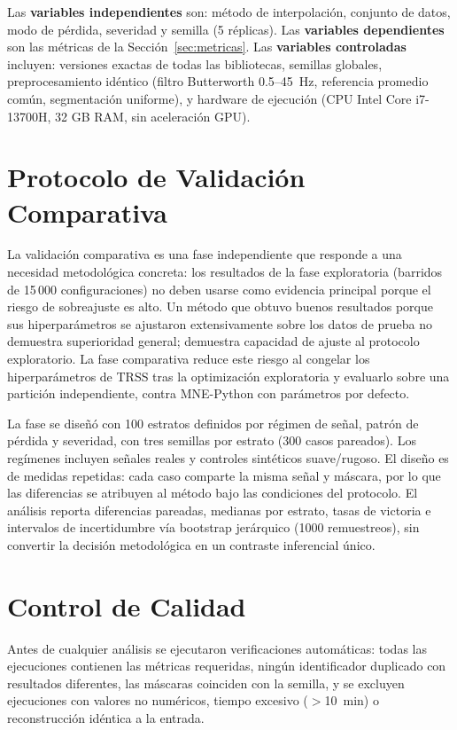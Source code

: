 Las \textbf{variables independientes} son: método de interpolación, conjunto de datos, modo de pérdida, severidad y semilla (5 réplicas). Las \textbf{variables dependientes} son las métricas de la Sección~\ref{sec:metricas}. Las \textbf{variables controladas} incluyen: versiones exactas de todas las bibliotecas, semillas globales, preprocesamiento idéntico (filtro Butterworth 0.5--45~Hz, referencia promedio común, segmentación uniforme), y hardware de ejecución (CPU Intel Core i7-13700H, 32 GB RAM, sin aceleración GPU).

\section{Protocolo de Validación Comparativa}
\label{sec:confirmatory}

La validación comparativa es una fase independiente que responde a una necesidad metodológica concreta: los resultados de la fase exploratoria (barridos de 15\,000 configuraciones) no deben usarse como evidencia principal porque el riesgo de sobreajuste es alto. Un método que obtuvo buenos resultados porque sus hiperparámetros se ajustaron extensivamente sobre los datos de prueba no demuestra superioridad general; demuestra capacidad de ajuste al protocolo exploratorio. La fase comparativa reduce este riesgo al congelar los hiperparámetros de TRSS tras la optimización exploratoria y evaluarlo sobre una partición independiente, contra MNE-Python con parámetros por defecto.

La fase se diseñó con 100 estratos definidos por régimen de señal, patrón de pérdida y severidad, con tres semillas por estrato (300 casos pareados). Los regímenes incluyen señales reales y controles sintéticos suave/rugoso. El diseño es de medidas repetidas: cada caso comparte la misma señal y máscara, por lo que las diferencias se atribuyen al método bajo las condiciones del protocolo. El análisis reporta diferencias pareadas, medianas por estrato, tasas de victoria e intervalos de incertidumbre vía bootstrap jerárquico (1000 remuestreos), sin convertir la decisión metodológica en un contraste inferencial único.

\section{Control de Calidad}

Antes de cualquier análisis se ejecutaron verificaciones automáticas: todas las ejecuciones contienen las métricas requeridas, ningún identificador duplicado con resultados diferentes, las máscaras coinciden con la semilla, y se excluyen ejecuciones con valores no numéricos, tiempo excesivo ($>$10~min) o reconstrucción idéntica a la entrada.

